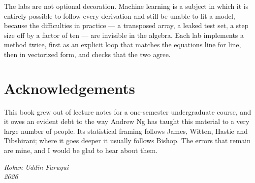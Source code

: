 The labs are not optional decoration. Machine learning is a subject in which it is
entirely possible to follow every derivation and still be unable to fit a model,
because the difficulties in practice --- a transposed array, a leaked test set, a
step size off by a factor of ten --- are invisible in the algebra. Each lab
implements a method twice, first as an explicit loop that matches the equations
line for line, then in vectorized form, and checks that the two agree.

\section*{Acknowledgements}

This book grew out of lecture notes for a one-semester undergraduate course, and
it owes an evident debt to the way Andrew Ng has taught this material to a very
large number of people. Its statistical framing follows James, Witten, Hastie and
Tibshirani; where it goes deeper it usually follows Bishop. The errors that remain
are mine, and I would be glad to hear about them.

\vspace{1cm}
\noindent\textit{Rokan Uddin Faruqui}\\
\noindent\textit{2026}

\cleardoublepage

